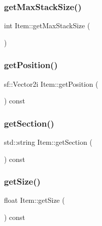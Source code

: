\subsubsection{\texorpdfstring{get\+Max\+Stack\+Size()}{getMaxStackSize()}}
{\footnotesize\ttfamily int Item\+::get\+Max\+Stack\+Size (\begin{DoxyParamCaption}{ }\end{DoxyParamCaption})}

\mbox{\label{class_item_ab015078a1ea19c197fc88b7a556d37cc}} 
\subsubsection{\texorpdfstring{get\+Position()}{getPosition()}}
{\footnotesize\ttfamily sf\+::\+Vector2i Item\+::get\+Position (\begin{DoxyParamCaption}{ }\end{DoxyParamCaption}) const}

\mbox{\label{class_item_abe4ed40d2027ca131b669d471b47f29f}} 
\subsubsection{\texorpdfstring{get\+Section()}{getSection()}}
{\footnotesize\ttfamily std\+::string Item\+::get\+Section (\begin{DoxyParamCaption}{ }\end{DoxyParamCaption}) const}

\mbox{\label{class_item_a2a84b0b0b25d4d1e8bb1b456d8094b84}} 
\subsubsection{\texorpdfstring{get\+Size()}{getSize()}}
{\footnotesize\ttfamily float Item\+::get\+Size (\begin{DoxyParamCaption}{ }\end{DoxyParamCaption}) const}

\mbox{\label{class_item_a7cbcf6f1a3b7c07a05b9cc0954e677db}} 
